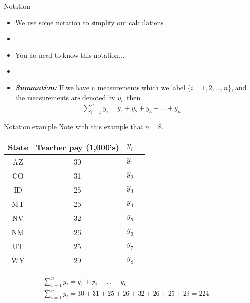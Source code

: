 \documentclass[xcolor=dvipsnames]{beamer}
\begin{document}
\begin{frame}{Notation}
	\begin{itemize}
		\item We use some notation to simplify our calculations
		\item[]
		\item You do need to know this notation...
		\item[]
		\item \textbf{\emph{Summation:}} If we have $n$ measurements which we label $\{i = 1, 2, \hdots, n\}$, and the measurements are denoted by $y_i$, then:
		\begin{gather*}
		\sum_{i=1}^{n} y_i = y_1 + y_2 + y_3 + \hdots + y_n
		\end{gather*}
	\end{itemize}
\end{frame}

\begin{frame}{Notation example}
	Note with this example that $n = 8$.
		\begin{center}
		\begin{tabular}{|c|c|c|c|}
			\hline 
			\textbf{State} & \textbf{Teacher pay (1,000's)} & $y_i$ \\ 
			\hline \hline
			AZ & 30 & $y_1$\\ \hline 
			CO &  31 & $y_2$ \\ \hline 
			ID & 25 & $y_3$ \\  \hline 
			MT &  26 & $y_4$ \\ \hline 
			NV & 32 & $y_5$ \\ \hline 
			NM &  26 & $y_6$\\ \hline 
			UT &  25 & $y_7$\\ \hline 
			WY &  29 & $y_8$\\ \hline 
		\end{tabular} 
	\end{center}
\vspace{-7 pt}
\begin{gather*}
	\sum_{i=1}^{n} y_i = y_1 + y_2 + \hdots + y_8 \\
		\sum_{i=1}^{n} y_i = 30+31+25+26+32+26+25+29 = 224
\end{gather*}
\end{frame}
\end{document}
